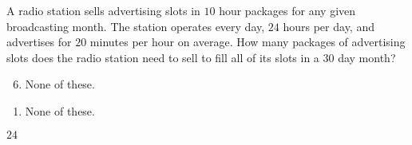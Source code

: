  
A radio station sells advertising slots in $10$ hour packages for any given broadcasting month.  The station operates every day, $24$ hours per day, and advertises for $20$ minutes per hour on average.  How many packages of advertising slots does the radio station need to sell to fill all of its slots in a $30$ day month? \vspace{4mm}\\


\ifsat
	\begin{enumerate}[label=\Alph*)]
	\end{enumerate}
\else
\fi

\ifacteven
	\begin{enumerate}[label=\textbf{\Alph*.},itemsep=\fill,align=left]
		\setcounter{enumii}{5}
		\item None of these. 
	\end{enumerate}
\else
\fi

\ifactodd
	\begin{enumerate}[label=\textbf{\Alph*.},itemsep=\fill,align=left]
		\item None of these. 
	\end{enumerate}
\else
\fi

\ifgridin
$24$
\else
\fi

